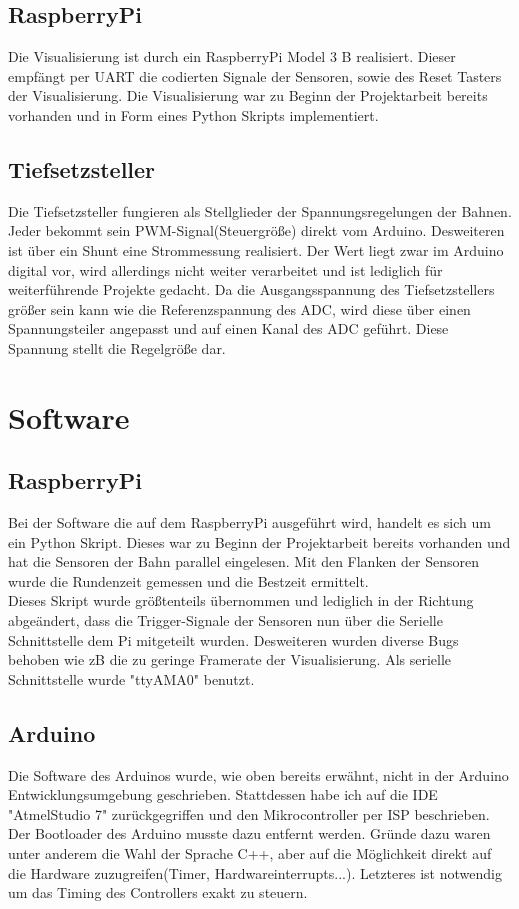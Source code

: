 \documentclass[a4paper, 11pt]{report}
\begin{document}
	\section{RaspberryPi}
		Die Visualisierung ist durch ein RaspberryPi Model 3 B realisiert. Dieser empfängt per UART die codierten Signale der Sensoren, sowie des Reset Tasters der Visualisierung.
		Die Visualisierung war zu Beginn der Projektarbeit bereits vorhanden und in Form eines Python Skripts implementiert.
	\section{Tiefsetzsteller}
		Die Tiefsetzsteller fungieren als Stellglieder der Spannungsregelungen der Bahnen.
		Jeder bekommt sein PWM-Signal(Steuergröße) direkt vom Arduino. Desweiteren ist über ein Shunt eine
		Strommessung realisiert. Der Wert liegt zwar im Arduino digital vor, wird allerdings nicht weiter
		verarbeitet und ist lediglich für weiterführende Projekte gedacht. Da die Ausgangsspannung des
		Tiefsetzstellers größer sein kann wie die Referenzspannung des ADC,
		wird diese über einen Spannungsteiler angepasst und auf einen Kanal des ADC geführt.
		Diese Spannung stellt die Regelgröße dar.
	\newpage

\chapter{Software}
	\section{RaspberryPi}

		Bei der Software die auf dem RaspberryPi ausgeführt wird, handelt es sich um ein Python Skript.
		Dieses war zu Beginn der Projektarbeit bereits vorhanden und hat die Sensoren
		der Bahn parallel eingelesen. Mit den Flanken der Sensoren wurde die Rundenzeit gemessen
		und die Bestzeit ermittelt.\\
		Dieses Skript wurde größtenteils übernommen und lediglich in der Richtung abgeändert,
		dass die Trigger-Signale der Sensoren nun über die Serielle Schnittstelle dem Pi mitgeteilt wurden.
		Desweiteren wurden diverse Bugs behoben wie zB die zu geringe Framerate der Visualisierung.
		Als serielle Schnittstelle wurde "ttyAMA0" benutzt.
		\newpage
	\section{Arduino}
		Die Software des Arduinos wurde, wie oben bereits erwähnt, nicht in der Arduino Entwicklungsumgebung
		geschrieben. Stattdessen habe ich auf die IDE "AtmelStudio 7" zurückgegriffen und den Mikrocontroller
		per ISP beschrieben. Der Bootloader des Arduino musste dazu entfernt werden.
		Gründe dazu waren unter anderem die Wahl der Sprache C++,
		aber auf die Möglichkeit direkt auf die Hardware zuzugreifen(Timer, Hardwareinterrupts...).
		Letzteres ist notwendig um das Timing des Controllers exakt zu steuern.\\
\end{document}
